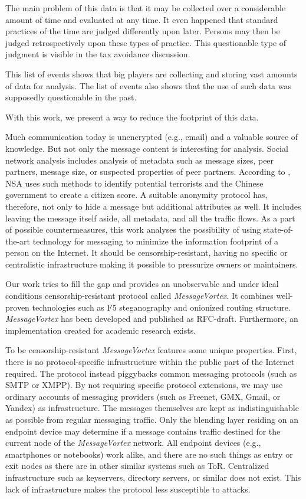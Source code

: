 \documentclass[acmsmall, screen]{acmart}
\begin{document}
The main problem of this data is that it may be collected over a considerable amount of time and evaluated at any time. It even happened that standard practices of the time are judged differently upon later. Persons may then be judged retrospectively upon these types of practice. This questionable type of judgment is visible in the tax avoidance discussion\cite{Amat1999}. 

This list of events shows that big players are collecting and storing vast amounts of data for analysis. The list of events also shows that the use of such data was supposedly questionable in the past. 

With this work, we present a way to reduce the footprint of this data.

Much communication today is unencrypted (e.g., email) and a valuable source of knowledge. But not only the message content is interesting for analysis. Social network analysis includes analysis of metadata such as message sizes, peer partners, message size, or suspected properties of peer partners. According to \cite{Ackerman2013}, NSA uses such methods to identify potential terrorists and the Chinese government to create a citizen score. A suitable anonymity protocol has, therefore, not only to hide a message but additional attributes as well. It includes leaving the message itself aside, all metadata, and all the traffic flows. As a part of possible countermeasures, this work analyses the possibility of using state-of-the-art technology for messaging to minimize the information footprint of a person on the Internet. It should be censorship-resistant, having no specific or centralistic infrastructure making it possible to pressurize owners or maintainers. 

Our work tries to fill the gap and provides an unobservable and under ideal conditions censorship-resistant protocol called \emph{MessageVortex}. It combines well-proven technologies such as F5 steganography and onionized routing structure. \emph{MessageVortex} has been developed and published as RFC-draft. Furthermore, an implementation created for academic research exists. 

To be censorship-resistant \emph{MessageVortex} features some unique properties. First, there is no protocol-specific infrastructure within the public part of the Internet required. The protocol instead piggybacks common messaging protocols (such as SMTP or XMPP). By not requiring specific protocol extensions, we may use ordinary accounts of messaging providers (such as Freenet, GMX, Gmail, or Yandex) as infrastructure. The messages themselves are kept as indistinguishable as possible from regular messaging traffic. Only the blending layer residing on an endpoint device may determine if a message contains traffic destined for the current node of the \emph{MessageVortex} network. All endpoint devices (e.g., smartphones or notebooks) work alike, and there are no such things as entry or exit nodes as there are in other similar systems such as ToR\cite{tor-spec}. Centralized infrastructure such as keyservers, directory servers, or similar does not exist. This lack of infrastructure makes the protocol less susceptible to attacks.
\end{document}
